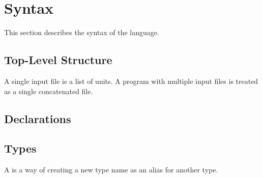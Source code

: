 \section{Syntax}

This section describes the syntax of the \gx{} language.

\subsection{Top-Level Structure}

\begin{grammar}
\end{grammar}

A single input file is a list of units. A \gx{} program with multiple
input files is treated as a single concatenated file.

\subsection{Declarations}

\begin{grammar}
\grRuleCont{\grEmpty}
\end{grammar}

\subsection{Types}

\begin{grammar}
\end{grammar}

A  is a way of creating a new type name as an alias
for another type.

\begin{grammar}
\end{grammar}

